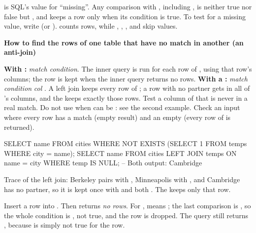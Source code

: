 \documentclass[10pt]{scrartcl}
\newenvironment{howto}[1]{\begin{mdframed}[style=howtostyle]{\color{NavyBlue}\textbf{#1}}\par\vspace{2pt}}{\end{mdframed}}
\begin{document}
 is SQL's value for ``missing''. Any comparison with , including , is neither true nor false but , and  keeps a row only when its condition is true. To test for a missing value, write  (or ).  counts rows, while , , ,  and  skip  values.

\begin{howto}{How to find the rows of one table that have no match in another (an anti-join)}
\begin{steps}
  \ii \textbf{With :}  \emph{match condition}\cd{)}. The inner query is run for each row of , using that row's columns; the row is kept when the inner query returns no rows.
  \ii \textbf{With a :}  \emph{match condition} \emph{col} . A left join keeps every row of ; a row with no partner gets  in all of 's columns, and the  keeps exactly those rows. Test a column of  that is never  in a real match.
  \ii Do not use  when  can be : see the second example.
  \ii Check an input where every row has a match (empty result) and an empty  (every row of  is returned).
\end{steps}
\end{howto}

\begin{example*}
\begin{sql}
SELECT name FROM cities WHERE NOT EXISTS (SELECT 1 FROM temps WHERE city = name);
SELECT name FROM cities LEFT JOIN temps ON name = city WHERE temp IS NULL;
-- Both output: Cambridge
\end{sql}
Trace of the left join: Berkeley pairs with , Minneapolis with , and Cambridge has no partner, so it is kept once with  and  both . The  keeps only that row.
\end{example*}

\begin{example*}
Insert a row  into . Then  returns \emph{no rows}. For ,  means ; the last comparison is , so the whole condition is , not true, and the row is dropped. The  query still returns , because  is simply not true for the  row.
\end{example*}
\end{document}
